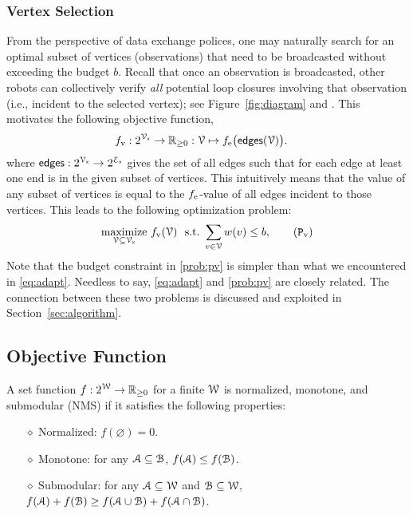 \documentclass[conference]{IEEEtran}
\begin{document}
\subsubsection{Vertex Selection}
From the perspective of data exchange polices, one may naturally search for an
optimal subset of vertices (observations) that need to be broadcasted without
exceeding the budget $b$. Recall that once an observation is broadcasted, other
robots can collectively verify \emph{all} potential loop closures involving that observation
(i.e., incident to the selected vertex); see Figure~\ref{fig:diagram} and
\cite{Giamou18_ICRA}.
This motivates the following objective function,
\begin{align}
  f_\text{v} : 2^{\mathcal{V}_\mathsf{x}} &\to \mathbb{R}_{\geq 0 }: \mathcal{V} \mapsto
  f_\text{e}\big(\mathsf{edges}(\mathcal{V})\big).
  \label{eq:fvdef}
\end{align}
where $\mathsf{edges} : 2^{\mathcal{V}_\mathsf{x}} \to 2^{\mathcal{E}_\mathsf{x}}$ gives the set of all edges 
such that for each edge at least one end is in the given subset of vertices.
This intuitively means that the value of any subset of vertices
is equal to the $f_\text{e}$-value of all edges incident to those vertices. 
This leads to the following optimization problem:
\begin{equation}
	 \underset{\VV \subseteq \Vall}{\mathrm{maximize }}\,\,
	  \fv(\VV) \,\,	 \mathrm{\,\,s.t.\,\,} \sum_{v \in \VV} w(v) \leq b,
	  \tag{$\mathtt{P}_\text{v}$}
  \label{prob:pv}
\end{equation}
Note that the budget constraint in \ref{prob:pv} is simpler than what
we encountered in \ref{eq:adapt}. Needless to say, \ref{eq:adapt} and \ref{prob:pv} are closely related. 
The connection between these two problems is discussed and exploited in Section~\ref{sec:algorithm}.

\subsection{Objective Function}
\label{subsec:obj}
\begin{definition}
  \label{def:NMS}
  A set function $f: 2^{\mathcal{W}} \to \mathbb{R}_{\geq 0}$ for a finite $\mathcal{W}$ is normalized, monotone, and submodular (NMS) if it satisfies the following properties:
  \begin{itemize}
	\item[$\diamond$] Normalized: $f(\varnothing) = 0$.
  \item[$\diamond$] Monotone: for any $\mathcal{A} \subseteq \mathcal{B}$, $f(\mathcal{A}) \leq f(\mathcal{B})$.
  \item[$\diamond$] Submodular: for any $\mathcal{A} \subseteq \mathcal{W}$ and $\mathcal{B} \subseteq \mathcal{W}$,
  \\ $f(\mathcal{A}) + f(\mathcal{B}) \geq 
  f(\mathcal{A} \cup \mathcal{B} ) + f(\mathcal{A} \cap \mathcal{B})$. 
  \end{itemize}
\end{definition}
\end{document}
